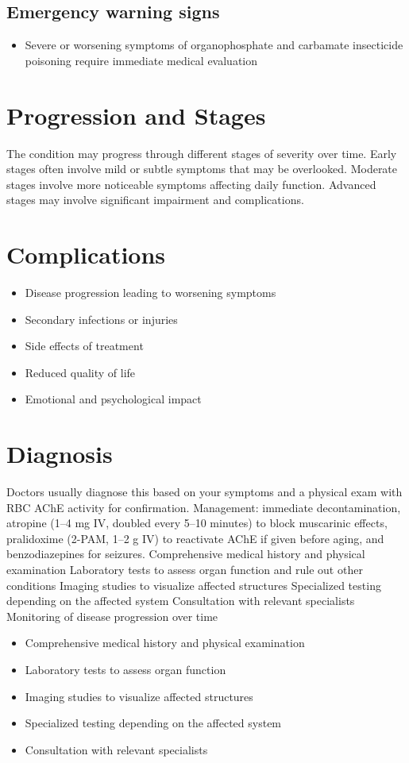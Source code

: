 \subsection{Emergency warning signs}
\begin{itemize}[noitemsep]
  \item Severe or worsening symptoms of organophosphate and carbamate insecticide poisoning require immediate medical evaluation
\end{itemize}
\section{Progression and Stages}
The condition may progress through different stages of severity over time. Early stages often involve mild or subtle symptoms that may be overlooked. Moderate stages involve more noticeable symptoms affecting daily function. Advanced stages may involve significant impairment and complications.
\section{Complications}
\begin{itemize}[noitemsep]
  \item Disease progression leading to worsening symptoms
  \item Secondary infections or injuries
  \item Side effects of treatment
  \item Reduced quality of life
  \item Emotional and psychological impact
\end{itemize}
\section{Diagnosis}
Doctors usually diagnose this based on your symptoms and a physical exam with RBC AChE activity for confirmation. Management: immediate decontamination, atropine (1--4 mg IV, doubled every 5--10 minutes) to block muscarinic effects, pralidoxime (2-PAM, 1--2 g IV) to reactivate AChE if given before aging, and benzodiazepines for seizures. Comprehensive medical history and physical examination Laboratory tests to assess organ function and rule out other conditions Imaging studies to visualize affected structures Specialized testing depending on the affected system Consultation with relevant specialists Monitoring of disease progression over time

\begin{itemize}[noitemsep]
  \item Comprehensive medical history and physical examination
  \item Laboratory tests to assess organ function
  \item Imaging studies to visualize affected structures
  \item Specialized testing depending on the affected system
  \item Consultation with relevant specialists
\end{itemize}

